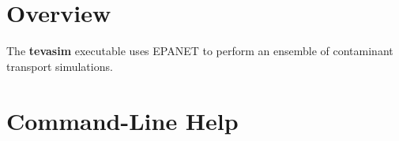 \section{Overview}\label{tevasimExecutable_tevasimOverview}

The {\bfseries tevasim} executable uses EPANET to perform an ensemble of contaminant transport simulations.

\section{Command-\/Line Help}\label{tevasimExecutable_tevasimUsage}



 
